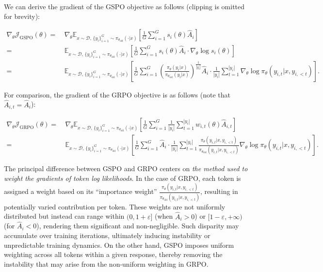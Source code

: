 We can derive the gradient of the GSPO objective as follows (clipping is omitted for brevity):

\begin{align}
\nabla_{\theta} \mathcal{J}_\text{GSPO} (\theta)
=&\ 
\nabla_{\theta} \mathbb{E}_{ x \sim \mathcal{D},\, \{y_i\}_{i=1}^G \sim \pi_{\theta_\text{old}}( \cdot | x) }
\left[ 
\frac{1}{G} \sum_{i=1}^{G} s_{i}(\theta) \widehat{A}_{i}
\right] \\
= &\ 
\mathbb{E}_{ x \sim \mathcal{D},\, \{y_i\}_{i=1}^G \sim \pi_{\theta_\text{old}}( \cdot | x) }
\left[ 
\frac{1}{G} \sum_{i=1}^{G}
s_{i}(\theta) \widehat{A}_{i}
\cdot \nabla_{\theta} \log s_{i}(\theta)
\right] \\
=&\ 
\mathbb{E}_{ x \sim \mathcal{D},\, \{y_i\}_{i=1}^G \sim \pi_{\theta_\text{old}}( \cdot | x) }
\left[ 
\frac{1}{G} \sum_{i=1}^{G} 
\left( \frac{ \pi_{\theta} (y_i | x) }{ \pi_{\theta_\text{old}} (y_i | x)} \right)^{\frac{1}{|y_i|}} \widehat{A}_{i} 
\cdot \frac{1}{|y_i|} \sum_{t=1}^{|y_i|} \nabla_{\theta} \log \pi_{\theta} (y_{i,t} | x, y_{i,<t}) 
\right].
\label{equ:gspo_grad}
\end{align}

For comparison, the gradient of the GRPO objective is as follows (note that $\widehat{A}_{i,t} = \widehat{A}_{i}$):

\begin{align}
\nabla_{\theta} \mathcal{J}_\text{GRPO} (\theta) 
=&\ 
\nabla_{\theta} \mathbb{E}_{ x \sim \mathcal{D},\, \{y_i\}_{i=1}^G \sim \pi_{\theta_\text{old}}( \cdot | x) }
\left[ \frac{1}{G} \sum_{i=1}^{G} \frac{1}{|y_i|} \sum_{t=1}^{|y_i|} 
w_{i,t}(\theta) \widehat{A}_{i,t}
\right] \\
=&\
\mathbb{E}_{ x \sim \mathcal{D},\, \{y_i\}_{i=1}^G \sim \pi_{\theta_\text{old}}( \cdot | x) }
\left[ \frac{1}{G} \sum_{i=1}^{G} \widehat{A}_{i} 
\cdot \frac{1}{|y_i|} \sum_{t=1}^{|y_i|} 
\frac{ \pi_{\theta} (y_{i,t} | x, y_{i,<t}) }{ \pi_{\theta_\text{old}} (y_{i,t} | x,y_{i,<t})} 
\nabla_{\theta} \log \pi_{\theta} (y_{i,t} | x, y_{i,<t})  
\right].
\end{align}

The principal difference between GSPO and GRPO centers on \textit{the method used to weight the gradients of token log likelihoods}. In the case of GRPO, each token is assigned a weight based on its ``importance weight'' $\frac{ \pi_{\theta} (y_{i,t} | x, y_{i,<t}) }{ \pi_{\theta_\text{old}} (y_{i,t} | x,y_{i,<t})}$, resulting in potentially varied contribution per token. These weights are not uniformly distributed but instead can range within $(0, 1+\varepsilon]$ (when $\widehat{A}_{i} >0$) or $[1-\varepsilon, +\infty)$ (for $\widehat{A}_{i} < 0$), rendering them significant and non-negligible. Such disparity may accumulate over training iterations, ultimately inducing instability or unpredictable training dynamics. On the other hand, GSPO imposes uniform weighting across all tokens within a given response, thereby removing the instability that may arise from the non-uniform weighting in GRPO.


